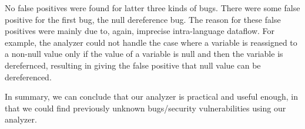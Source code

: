 No false positives were found for latter three kinds of bugs.  There were some
false positive for the first bug, the null dereference bug. The reason for
these false positives were mainly due to, again, imprecise intra-language
dataflow. For example, the analyzer could not handle the case where a variable
is reassigned to a non-null value only if the value of a variable is null and
then the variable is derefernced, resulting in giving the false positive that
null value can be dereferenced.

In summary, we can conclude that our analyzer is practical and useful enough,
in that we could find previously unknown bugs/security vulnerabilities using
our analyzer.

